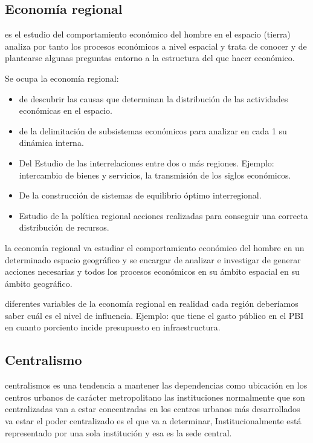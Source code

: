 \documentclass[
  a4paper,
]{article}
\providecommand{\tightlist}{%
  \setlength{\itemsep}{0pt}\setlength{\parskip}{0pt}}\usepackage{longtable,booktabs,array}
\begin{document}
\subsection{Economía regional}\label{economuxeda-regional}

es el estudio del comportamiento económico del hombre en el espacio
(tierra) analiza por tanto los procesos económicos a nivel espacial y
trata de conocer y de plantearse algunas preguntas entorno a la
estructura del que hacer económico.

Se ocupa la economía regional:

\begin{itemize}
\tightlist
\item
  de descubrir las causas que determinan la distribución de las
  actividades económicas en el espacio.
\item
  de la delimitación de subsistemas económicos para analizar en cada 1
  su dinámica interna.
\item
  Del Estudio de las interrelaciones entre dos o más regiones. Ejemplo:
  intercambio de bienes y servicios, la transmisión de los siglos
  económicos.
\item
  De la construcción de sistemas de equilibrio óptimo interregional.
\item
  Estudio de la política regional acciones realizadas para conseguir una
  correcta distribución de recursos.
\end{itemize}

la economía regional va estudiar el comportamiento económico del hombre
en un determinado espacio geográfico y se encargar de analizar e
investigar de generar acciones necesarias y todos los procesos
económicos en su ámbito espacial en su ámbito geográfico.

diferentes variables de la economía regional en realidad cada región
deberíamos saber cuál es el nivel de influencia. Ejemplo: que tiene el
gasto público en el PBI en cuanto porciento incide presupuesto en
infraestructura.

\subsection{Centralismo}\label{centralismo}

centralismos es una tendencia a mantener las dependencias como ubicación
en los centros urbanos de carácter metropolitano las instituciones
normalmente que son centralizadas van a estar concentradas en los
centros urbanos más desarrollados va estar el poder centralizado es el
que va a determinar, Institucionalmente está representado por una sola
institución y esa es la sede central.
\end{document}

